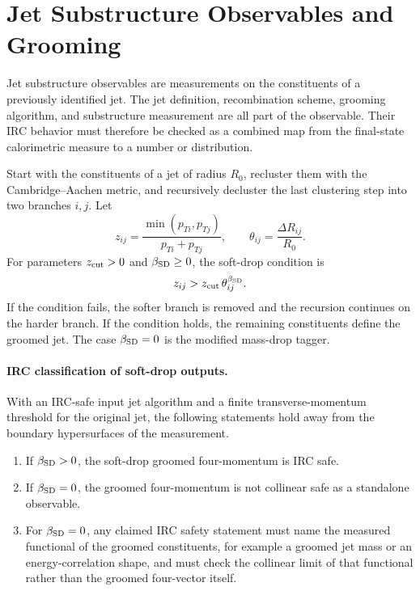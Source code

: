 \section{Jet Substructure Observables and Grooming}

Jet substructure observables are measurements on the constituents of a
previously identified jet.  The jet definition, recombination scheme, grooming
algorithm, and substructure measurement are all part of the observable.  Their
IRC behavior must therefore be checked as a combined map from the final-state
calorimetric measure to a number or distribution.

\begin{definition}
\label{def:soft-drop-grooming}
Start with the constituents of a jet of radius \(R_0\), recluster them with
the Cambridge--Aachen metric, and recursively decluster the last clustering
step into two branches \(i,j\).  Let
\[
  z_{ij}=\frac{\min(p_{Ti},p_{Tj})}{p_{Ti}+p_{Tj}},
  \qquad
  \theta_{ij}=\frac{\Delta R_{ij}}{R_0}.
\]
For parameters \(z_{\rm cut}>0\) and \(\beta_{\rm SD}\geq0\), the soft-drop
condition is
\[
  z_{ij}>z_{\rm cut}\,\theta_{ij}^{\beta_{\rm SD}} .
\]
If the condition fails, the softer branch is removed and the recursion
continues on the harder branch.  If the condition holds, the remaining
constituents define the groomed jet.  The case \(\beta_{\rm SD}=0\) is the
modified mass-drop tagger.
\end{definition}

\paragraph{IRC classification of soft-drop outputs.}
With an IRC-safe input jet algorithm and a finite transverse-momentum
threshold for the original jet, the following statements hold away from the
boundary hypersurfaces of the measurement.
\begin{enumerate}
  \item If \(\beta_{\rm SD}>0\), the soft-drop groomed four-momentum is IRC
  safe.
  \item If \(\beta_{\rm SD}=0\), the groomed four-momentum is not collinear safe
  as a standalone observable.
  \item For \(\beta_{\rm SD}=0\), any claimed IRC safety statement must name
  the measured functional of the groomed constituents, for example a groomed
  jet mass or an energy-correlation shape, and must check the collinear limit
  of that functional rather than the groomed four-vector itself.
\end{enumerate}

